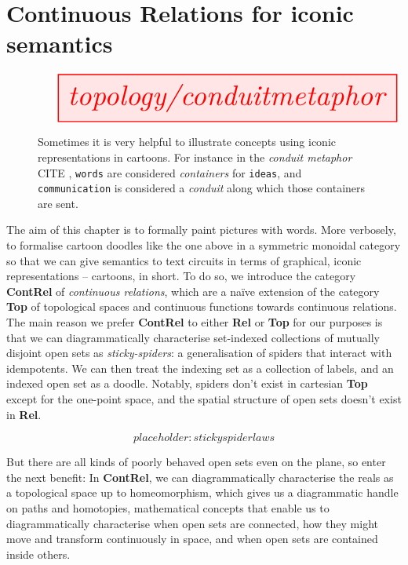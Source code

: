 \section{Continuous Relations for iconic semantics}



\begin{figure}[h!]
\centering
\[\resizebox{\textwidth}{!}{\tikzfig{topology/conduitmetaphor}}\]
\caption{Sometimes it is very helpful to illustrate concepts using iconic representations in cartoons. For instance in the \emph{conduit metaphor} \bR CITE \e, \texttt{words} are considered \emph{containers} for \texttt{ideas}, and \texttt{communication} is considered a \emph{conduit} along which those containers are sent.}
\end{figure}

The aim of this chapter is to formally paint pictures with words. More verbosely, to formalise cartoon doodles like the one above in a symmetric monoidal category so that we can give semantics to text circuits in terms of graphical, iconic representations -- cartoons, in short. To do so, we introduce the category \textbf{ContRel} of \emph{continuous relations}, which are a na\"{i}ve extension of the category \textbf{Top} of topological spaces and continuous functions towards continuous relations.\\

The main reason we prefer \textbf{ContRel} to either \textbf{Rel} or \textbf{Top} for our purposes is that we can diagrammatically characterise set-indexed collections of mutually disjoint open sets as \emph{sticky-spiders}: a generalisation of spiders that interact with idempotents. We can then treat the indexing set as a collection of labels, and an indexed open set as a doodle. Notably, spiders don't exist in cartesian \textbf{Top} except for the one-point space, and the spatial structure of open sets doesn't exist in \textbf{Rel}.

\[placeholder: stickyspider laws\]

But there are all kinds of poorly behaved open sets even on the plane, so enter the next benefit: In \textbf{ContRel}, we can diagrammatically characterise the reals as a topological space up to homeomorphism, which gives us a diagrammatic handle on paths and homotopies, mathematical concepts that enable us to diagrammatically characterise when open sets are connected, how they might move and transform continuously in space, and when open sets are contained inside others.

